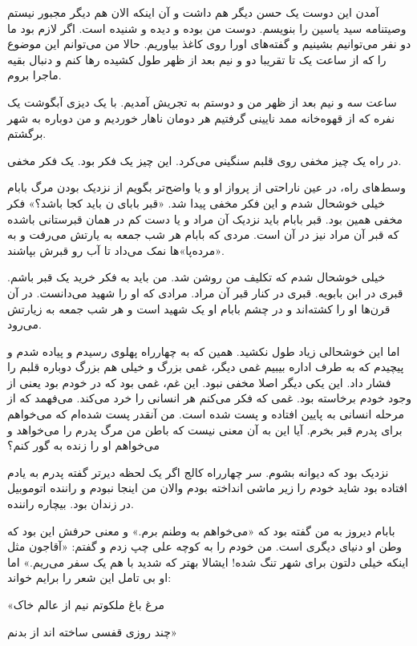\documentclass[12pt,a4paper]{book}
\begin{document}
آمدن این دوست یک حسن دیگر هم داشت و آن اینکه الان هم دیگر مجبور نیستم وصیتنامه سید یاسین را بنویسم. دوست من بوده و دیده و شنیده است. اگر لازم بود ما دو نفر می‌توانیم بشینیم و گفته‌های اورا روی کاغذ بیاوریم. حالا من می‌توانم این موضوع را که از ساعت یک تا تقریبا دو و نیم بعد از ظهر طول کشیده رها کنم و دنبال بقیه ماجرا بروم.

ساعت سه و نیم بعد از ظهر من و دوستم به تجریش آمدیم. با یک دیزی آبگوشت یک نفره که از قهوه‌خانه ممد نایینی گرفتیم هر دومان ناهار خوردیم و من دوباره به شهر برگشتم.

در راه یک چیز مخفی روی قلبم سنگینی می‌کرد. این چیز یک فکر بود. یک فکر مخفی.

وسط‌های راه، در عین ناراحتی از پرواز او و یا واضح‌تر بگویم از نزدیک بودن مرگ بابام خیلی خوشحال شدم و این فکر مخفی پیدا شد. «قبر بابای ن باید کجا باشد؟» فکر مخفی همین بود. قبر بابام باید نزدیک آن مراد و یا دست کم در همان قبرستانی باشده که قبر آن مراد نیز در آن است. مردی که بابام هر شب جمعه به یارتش می‌رفت و به «مرده‌پا»ها نمک می‌داد تا آب رو قبرش بپاشند.

خیلی خوشحال شدم که تکلیف من روشن شد. من باید به فکر خرید یک قبر باشم. قبری در ابن بابویه. قبری در کنار قبر آن مراد. مرادی که او را شهید می‌دانست. در آن قرن‌ها او را کشته‌اند و در چشم بابام او یک شهید است و هر شب جمعه به زیارتش می‌رود.

اما این خوشحالی زیاد طول نکشید. همین که به چهارراه پهلوی رسیدم و پیاده شدم و پیچیدم که به طرف اداره بیبیم غمی دیگر، غمی بزرگ و خیلی هم بزرگ دوباره قلبم را فشار داد. این یکی دیگر اصلا مخفی نبود. این غم، غمی بود که در خودم بود یعنی از وجود خودم برخاسته بود. غمی که فکر می‌کنم هر انسانی را خرد می‌کند. می‌فهمد که از مرحله انسانی به پایین افتاده و پست شده است. من آنقدر پست شده‌ام که می‌خواهم برای پدرم قبر بخرم. آیا این به آن معنی نیست که باطن من مرگ پدرم را می‌خواهد و می‌خواهم او را زنده به گور کنم؟

نزدیک بود که دیوانه بشوم. سر چهارراه کالج اگر یک لحظه دیرتر گفته پدرم به یادم افتاده بود شاید خودم را زیر ماشی انداخته بودم والان من اینجا نبودم و راننده اتوموبیل در زندان بود. بیچاره راننده.

بابام دیروز به من گفته بود که «می‌خواهم به وطنم برم.» و معنی حرفش این بود که وطن او دنیای دیگری است. من خودم را به کوچه علی چپ زدم و گفتم: «آقاجون مثل اینکه خیلی دلتون برای شهر تنگ شده! ایشالا بهتر که شدید با هم یک سفر می‌ریم.» اما او بی تامل این شعر را برایم خواند:
\begin{center}
«مرغ باغ ملکوتم نیم از عالم خاک

چند روزی قفسی ساخته اند از بدنم»
\end{center}
\end{document}
